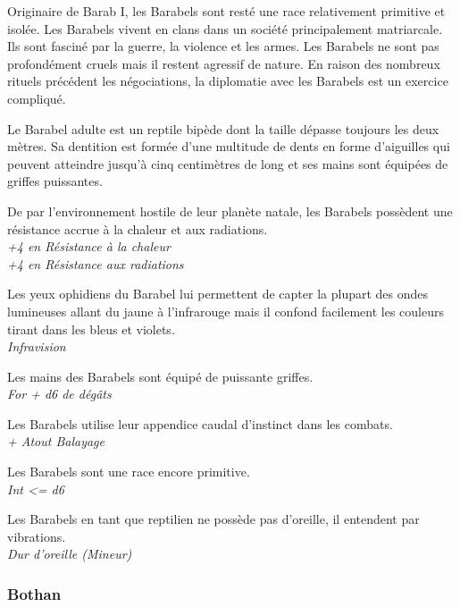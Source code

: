 Originaire de Barab I, les Barabels sont resté une race relativement primitive et isolée. Les Barabels vivent en clans dans un société principalement matriarcale. Ils sont fasciné par la guerre, la violence et les armes. Les Barabels ne sont pas profondément cruels mais il restent agressif de nature. En raison des nombreux rituels précédent les négociations, la diplomatie avec les Barabels est un exercice compliqué.

Le Barabel adulte est un reptile bipède dont la taille dépasse toujours les deux mètres. Sa dentition est formée d'une multitude de dents en forme d'aiguilles qui peuvent atteindre jusqu'à cinq centimètres de long et ses mains sont équipées de griffes puissantes.

\begin{description}[align=left]
\item [Enfance difficile] 	%
		De par l'environnement hostile de leur planète natale, les Barabels possèdent une résistance accrue à la chaleur et aux radiations.\\
		\emph{+4 en Résistance à la chaleur}\\
		\emph{+4 en Résistance aux radiations}
\item [\OE{il} Ophidien] 	%
		Les yeux ophidiens du Barabel lui permettent de capter la plupart des ondes lumineuses allant du jaune à l'infrarouge mais il confond facilement les couleurs tirant dans les bleus et violets.\\
		\emph{Infravision}
\item [Arme naturelle]		%
		Les mains des Barabels sont équipé de puissante griffes.\\
		\emph{For + d6 de dégâts}
\item [Balayage]			%
		Les Barabels utilise leur appendice caudal d'instinct dans les combats.\\
		\emph{+ Atout Balayage}
\item [Primitif]			%
		Les Barabels sont une race encore primitive.\\
		\emph{Int <= d6}
\item [Dur d'oreille]		%
		Les Barabels en tant que reptilien ne possède pas d'oreille, il entendent par vibrations.\\
		\emph{Dur d'oreille (Mineur)}
\end{description}


\subsubsection{Bothan}

